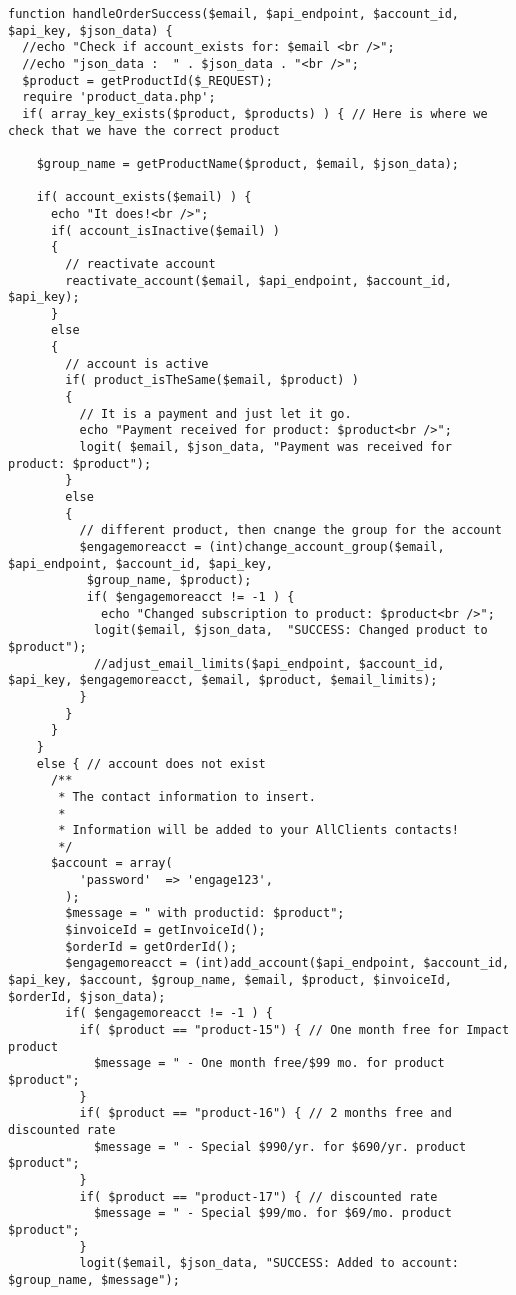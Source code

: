 \documentclass[final,letterpaper,12pt]{article}
\begin{document}
\begin{appendices}
\begin{verbatim}
function handleOrderSuccess($email, $api_endpoint, $account_id, $api_key, $json_data) {
  //echo "Check if account_exists for: $email <br />";
  //echo "json_data :  " . $json_data . "<br />";
  $product = getProductId($_REQUEST);
  require 'product_data.php';
  if( array_key_exists($product, $products) ) { // Here is where we check that we have the correct product

    $group_name = getProductName($product, $email, $json_data);

    if( account_exists($email) ) {
      echo "It does!<br />";
      if( account_isInactive($email) )
      {
        // reactivate account
        reactivate_account($email, $api_endpoint, $account_id, $api_key);
      }
      else
      {
        // account is active
        if( product_isTheSame($email, $product) )
        {
          // It is a payment and just let it go.
          echo "Payment received for product: $product<br />";
          logit( $email, $json_data, "Payment was received for product: $product");
        }
        else
        {
          // different product, then cnange the group for the account
          $engagemoreacct = (int)change_account_group($email, $api_endpoint, $account_id, $api_key,
           $group_name, $product);
           if( $engagemoreacct != -1 ) {
             echo "Changed subscription to product: $product<br />";
            logit($email, $json_data,  "SUCCESS: Changed product to $product");
            //adjust_email_limits($api_endpoint, $account_id, $api_key, $engagemoreacct, $email, $product, $email_limits);
          }
        }
      }
    }
    else { // account does not exist
      /**
       * The contact information to insert.
       *
       * Information will be added to your AllClients contacts!
       */
      $account = array(
          'password'  => 'engage123',
        );
        $message = " with productid: $product";
        $invoiceId = getInvoiceId();
        $orderId = getOrderId();
        $engagemoreacct = (int)add_account($api_endpoint, $account_id, $api_key, $account, $group_name, $email, $product, $invoiceId, $orderId, $json_data);
        if( $engagemoreacct != -1 ) {
          if( $product == "product-15") { // One month free for Impact product
            $message = " - One month free/$99 mo. for product $product";
          }
          if( $product == "product-16") { // 2 months free and discounted rate
            $message = " - Special $990/yr. for $690/yr. product $product";
          }
          if( $product == "product-17") { // discounted rate
            $message = " - Special $99/mo. for $69/mo. product $product";
          }
          logit($email, $json_data, "SUCCESS: Added to account: $group_name, $message");


\end{verbatim}
\end{appendices}
\end{document}
